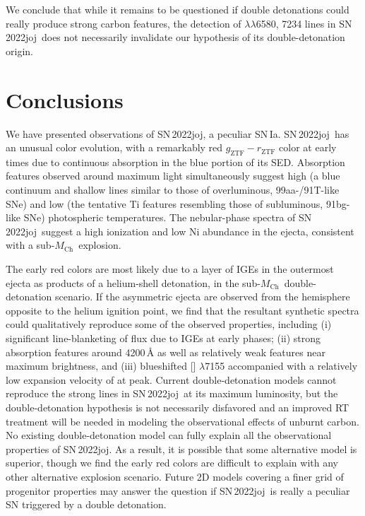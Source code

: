 \documentclass[twocolumn]{aastex631}
\newcommand{\sn}{SN\,2022joj}
\newcommand{\Mch}{$M_\mathrm{Ch}$}
\begin{document}
\begin{CJK*}{UTF8}{gbsn}
We conclude that while it remains to be questioned if double detonations could really produce strong carbon features, the detection of  $\lambda\lambda$6580, 7234 lines in \sn\ does not necessarily invalidate our hypothesis of its double-detonation origin.


\section{Conclusions} \label{sec:conclusion}
We have presented observations of \sn, a peculiar SN\,Ia. \sn\ has an unusual color evolution, with a remarkably red $g_\mathrm{ZTF}-r_\mathrm{ZTF}$ color at early times due to continuous absorption in the blue portion of its SED. Absorption features observed around maximum light simultaneously suggest high (a blue continuum and shallow  lines similar to those of overluminous, 99aa-/91T-like SNe) and low (the tentative Ti features resembling those of subluminous, 91bg-like SNe) photospheric temperatures. The nebular-phase spectra of \sn\ suggest a high ionization and low Ni abundance in the ejecta, consistent with a sub-\Mch\ explosion.

The early red colors are most likely due to a layer of IGEs in the outermost ejecta as products of a helium-shell detonation, in the sub-\Mch\ double-detonation scenario. If the asymmetric ejecta are observed from the hemisphere opposite to the helium ignition point, we find that the resultant synthetic spectra could qualitatively reproduce some of the observed properties, including (i) significant line-blanketing of flux due to IGEs at early phases; (ii) strong absorption features around 4200\,\r{A} as well as relatively weak  features near maximum brightness, and (iii) blueshifted [] $\lambda$7155 accompanied with a relatively low expansion velocity of  at peak. Current double-detonation models cannot reproduce the strong  lines in \sn\ at its maximum luminosity, but the double-detonation hypothesis is not necessarily disfavored and an improved RT treatment will be needed in modeling the observational effects of unburnt carbon.
No existing double-detonation model can fully explain all the observational properties of \sn. As a result, it is possible that some alternative model is superior, though we find the early red colors are difficult to explain with any other alternative explosion scenario. Future 2D models covering a finer grid of progenitor properties may answer the question if \sn\ is really a peculiar SN triggered by a double detonation.\\


\end{CJK*}
\end{document}
